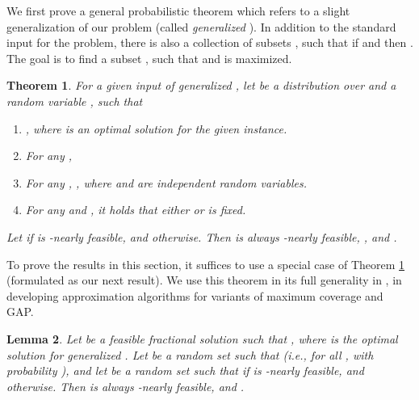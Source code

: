 \documentclass[11pt]{article}
\newtheorem{theorem}{Theorem}[section]
\newtheorem{lemma}[theorem]{Lemma}
\newtheorem{claim}{Claim}[section]
\newenvironment{proof}{\noindent{\bf Proof:}}{
 \hspace*{\fill}  \vskip \belowdisplayskip}
\newenvironment{dl_thm_proof}[1]{\noindent{\bf Proof of Theorem #1:}}{
 \hspace*{\fill}  \vskip \belowdisplayskip}
\begin{document}
{We first prove a general probabilistic
theorem which refers to a slight generalization of our problem
(called {\em generalized }).
In addition to the standard
input for the problem, there is also a collection of subsets ,
such that if  and 
then . The goal is  to find
a subset , such that  
and  is maximized.

\begin{theorem}
\label{thm:prb_claim}
For a given input of generalized ,
let  be a distribution over 
and  a random variable , such that
\begin{enumerate}
\item , where  is an optimal
solution for the given instance.
\item For any , 
\item For any , , where
  and  are independent random
variables.
\item
\label{thm:prb_claim:c4}
For any  and , it holds that
either  or  is fixed.
\end{enumerate}
Let  if  is -nearly feasible, and  otherwise. Then  is
always -nearly feasible, , and
.
\end{theorem}

To prove the results in this section, it suffices to use a special case of Theorem
 \ref{thm:prb_claim} (formulated as our next result). We use
this theorem in its full generality in \cite{full}, in developing approximation
 algorithms for variants of maximum coverage and GAP.

\begin{lemma}
\label{lemma:expected_random}
Let  be a feasible fractional solution
such that
, where  is the optimal solution for generalized .
 Let  be a random set such
that  (i.e., for all ,  with probability ),
 and
let  be a random set such that  if  is -nearly feasible, and  otherwise.
Then  is always -nearly feasible, and
.
\end{lemma}

}
\end{document}
